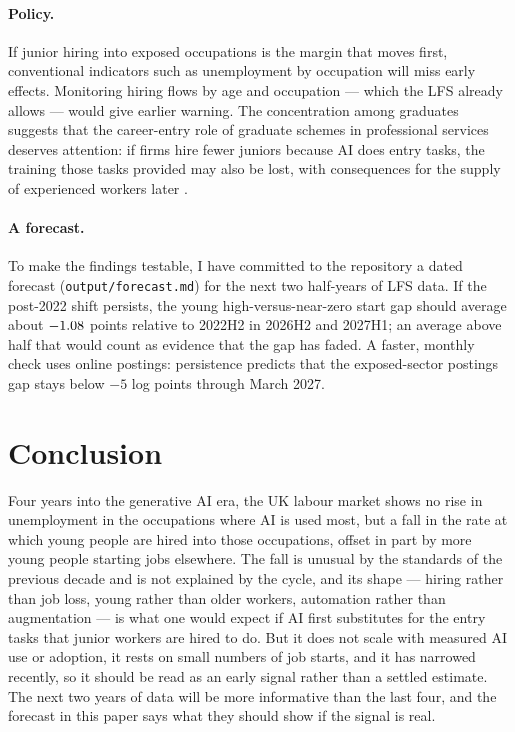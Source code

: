 \documentclass[11pt]{article}
\begin{document}
\paragraph{Policy.} If junior hiring into exposed occupations is the margin that moves first, conventional indicators such as unemployment by occupation will miss early effects. Monitoring hiring flows by age and occupation --- which the LFS already allows --- would give earlier warning. The concentration among graduates suggests that the career-entry role of graduate schemes in professional services deserves attention: if firms hire fewer juniors because AI does entry tasks, the training those tasks provided may also be lost, with consequences for the supply of experienced workers later \citep{acemoglu2025}.

\paragraph{A forecast.} To make the findings testable, I have committed to the repository a dated forecast (\texttt{output/forecast.md}) for the next two half-years of LFS data. If the post-2022 shift persists, the young high-versus-near-zero start gap should average about $-1.08$ points relative to 2022H2 in 2026H2 and 2027H1; an average above half that would count as evidence that the gap has faded. A faster, monthly check uses online postings: persistence predicts that the exposed-sector postings gap stays below $-5$ log points through March 2027.

\section{Conclusion}\label{sec:conclusion}

Four years into the generative AI era, the UK labour market shows no rise in unemployment in the occupations where AI is used most, but a fall in the rate at which young people are hired into those occupations, offset in part by more young people starting jobs elsewhere. The fall is unusual by the standards of the previous decade and is not explained by the cycle, and its shape --- hiring rather than job loss, young rather than older workers, automation rather than augmentation --- is what one would expect if AI first substitutes for the entry tasks that junior workers are hired to do. But it does not scale with measured AI use or adoption, it rests on small numbers of job starts, and it has narrowed recently, so it should be read as an early signal rather than a settled estimate. The next two years of data will be more informative than the last four, and the forecast in this paper says what they should show if the signal is real.
\end{document}

